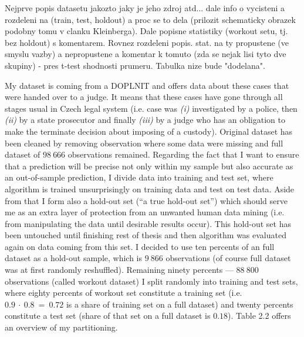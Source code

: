 \documentclass[12pt, twoside]{book} %
\begin{document}
Nejprve popis datasetu jakozto jaky je jeho zdroj atd... dale info o vycisteni a  rozdeleni na (train, test, holdout) a proc se to dela (prilozit schematicky obrazek podobny tomu v clanku Kleinberga). Dale popisne statistiky (workout setu, tj. bez holdout) s komentarem. Rovnez rozdeleni popis. stat. na ty propustene (ve smyslu vazby) a nepropustene a komentar k tomuto (zda se nejak lisi tyto dve skupiny) -  pres t-test shodnosti prumeru. Tabulka nize bude "dodelana". 


My dataset is coming from a \newline
 DOPLNIT \newline
and offers data about these cases that were handed over to a judge. It means that these cases have gone through all stages usual in Czech legal system (i.e. case was \textit{(i)} investigated by a police, then \textit{(ii)} by a state prosecutor and finally \textit{(iii)} by a judge who has an obligation to make the terminate decision about imposing of a custody).\newline
Original dataset has been cleaned by removing observation where some data were missing and full dataset of $98~666$ observations remained. Regarding the fact that I want to ensure that a prediction will be precise not only within my sample but also accurate as an out-of-sample prediction, I divide data into training and test set, where algorithm is trained unsurprisingly on training data and test on test data. Aside from that I form also a hold-out set (“a true hold-out set”) which should serve me as an extra layer of protection from an unwanted human data mining (i.e. from manipulating the data until desirable results occur). This hold-out set has been untouched until finishing rest of thesis and then algorithm was evaluated again on data coming from this set. I decided to use ten percents of an full dataset as a hold-out sample, which is $9~866$ observations (of course full dataset was at first randomly reshuffled). Remaining ninety percents — $88~800$ observations (called workout dataset) I split randomly into training and test sets, where eighty percents of workout set constitute a training set (i.e. $0.9~\cdot~0.8~=~0.72$ is a share of training set on a full dataset) and twenty percents constitute a test set (share of that set on a full dataset is $0.18$). Table 2.2 offers an overview of my partitioning.\newline
\end{document}
